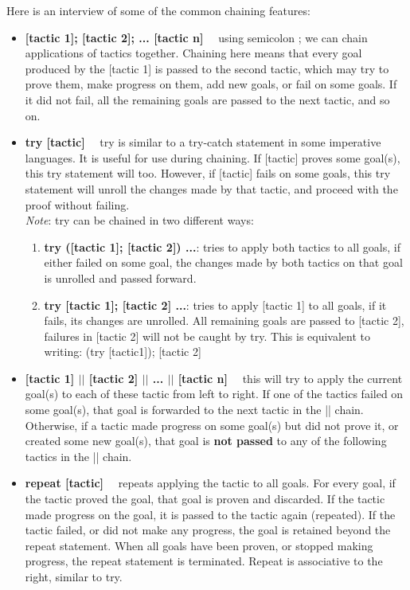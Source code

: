 \documentclass{article}
\begin{document}
\noindent Here is an interview of some of the common chaining features:
\begin{itemize}
    \item \textbf{[tactic 1]; [tactic 2]; ... [tactic n]} \ \ using semicolon ; we can chain applications of tactics together. Chaining here means that every goal produced by the [tactic 1] is passed to the second tactic, which may try to prove
    them, make progress on them, add new goals, or fail on some goals. If it did not fail, all the remaining goals are passed to the next tactic, and so on.
    \item \textbf{try [tactic]} \ \ try is similar to a try-catch statement in some imperative languages. It is useful for use during chaining. If [tactic] proves some goal(s), this try statement will too. However, if [tactic] fails on some goals,
    this try statement will unroll the changes made by that tactic, and proceed with the proof without failing.\\
    \textit{Note}: try can be chained in two different ways: \begin{enumerate}
        \item \textbf{try ([tactic 1]; [tactic 2]) ...}: tries to apply both tactics to all goals, if either failed
        on some goal, the changes made by both tactics on that goal is unrolled and passed forward.
        \item \textbf{try [tactic 1]; [tactic 2] ...}: tries to apply [tactic 1] to all goals, if it fails, its changes are unrolled. All remaining goals are passed to [tactic 2], failures in [tactic 2] will not be caught by try.
        This is equivalent to writing: (try [tactic1]); [tactic 2]
    \end{enumerate} 
    \item \textbf{[tactic 1] $||$ [tactic 2] $||$ ... $||$ [tactic n]} \ \ this will try to apply the current goal(s) to each of these tactic from left to right. If one of the tactics failed on some goal(s), that goal is forwarded to the next tactic in the || chain.
    Otherwise, if a tactic made progress on some goal(s) but did not prove it, or created some new goal(s), that goal is \textbf{not passed} to any of the following tactics in the || chain.
    \item \textbf{repeat [tactic]} \ \ repeats applying the tactic to all goals. For every goal, if the tactic proved the goal, that goal is proven and discarded. If the tactic made progress on the goal, it is passed to the tactic again (repeated). If the tactic
    failed, or did not make any progress, the goal is retained beyond the repeat statement. When all goals have been proven, or stopped making progress, the repeat statement is terminated. Repeat is associative to the right, similar to try.

\end{itemize}
\end{document}
